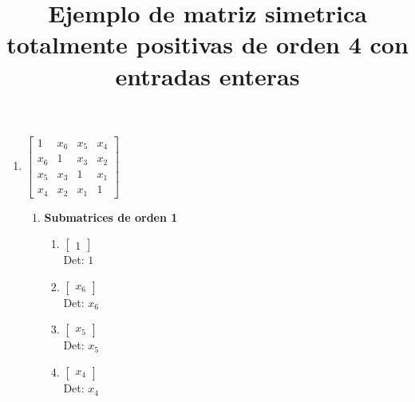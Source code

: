 \documentclass[12pt]{article}
\begin{document}
\title{Ejemplo de matriz simetrica totalmente positivas de orden 4 con entradas enteras}
\maketitle


\begin{enumerate}

\item $\left[\begin{matrix}1 & x_{6} & x_{5} & x_{4}\\x_{6} & 1 & x_{3} & x_{2}\\x_{5} & x_{3} & 1 & x_{1}\\x_{4} & x_{2} & x_{1} & 1\end{matrix}\right]$\\

\begin{enumerate}

\item {\bf Submatrices de orden 1}\\

\begin{enumerate}


\item $\displaystyle \left[\begin{matrix}1\end{matrix}\right]$\\

Det: $1$\\


\item $\displaystyle \left[\begin{matrix}x_{6}\end{matrix}\right]$\\

Det: $x_{6}$\\


\item $\displaystyle \left[\begin{matrix}x_{5}\end{matrix}\right]$\\

Det: $x_{5}$\\


\item $\displaystyle \left[\begin{matrix}x_{4}\end{matrix}\right]$\\

Det: $x_{4}$\\



\end{enumerate}
\end{enumerate}
\end{enumerate}
\end{document}
